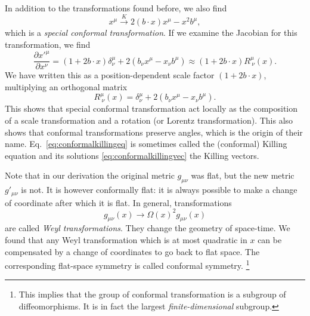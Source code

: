 \documentclass[a4paper,12pt]{article}
\numberwithin{equation}{section}
\begin{document}
In addition to the transformations found before, we also find
\begin{equation}
	x^\mu \xrightarrow{K} 2 (b \cdot x) x^\mu - x^2 b^\mu,
\end{equation}
which is a \emph{special conformal transformation}.
If we examine the Jacobian for this transformation, we find
\begin{equation}
	\frac{\partial x'^\mu}{\partial x^\nu}
	= \left(1 + 2 b \cdot x \right) \delta^\mu_\nu
	+ 2 \left( b_\nu x^\mu - x_\nu b^\mu \right)
	\approx \left(1 + 2 b \cdot x \right)
	R^\mu_{~\nu}(x).
\end{equation}
We have written this as a position-dependent scale factor $(1 + 2 b \cdot x)$, multiplying an orthogonal matrix
\begin{equation}
	R^\mu_{~\nu}(x) = \delta^\mu_\nu
	+ 2 \left( b_\nu x^\mu - x_\nu b^\mu \right).
\end{equation}
This shows that special conformal transformation act locally as the composition of a scale transformation and a rotation (or Lorentz transformation). This also shows that conformal transformations preserve angles, which is the origin of their name.
Eq.~\eqref{eq:conformalkillingeq} is sometimes called the (conformal) Killing equation and its solutions \eqref{eq:conformalkillingvec} the Killing vectors.



Note that in our derivation the original metric $g_{\mu\nu}$ was flat, but the new metric $g'_{\mu\nu}$ is not. It is however conformally flat: it is always possible to make a change of coordinate after which it is flat. In general, transformations
\begin{equation}
	g_{\mu\nu}(x) \to \Omega(x)^2 g_{\mu\nu}(x)
\end{equation}
are called \emph{Weyl transformations}. They change the geometry of space-time. We found that any Weyl transformation which is at most quadratic in $x$ can be compensated by a change of coordinates to go back to flat space. The corresponding flat-space symmetry is called conformal symmetry.%
%
\footnote{This implies that the group of conformal transformation is a subgroup of diffeomorphisms. It is in fact the largest \emph{finite-dimensional} subgroup.}%
\end{document}
